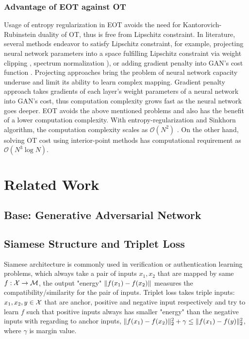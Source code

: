 \subsubsection{Advantage of EOT against OT}

Usage of entropy regularization in EOT avoids the need for Kantorovich-Rubinstein duality
of OT, thus is free from Lipschitz constraint. In literature, several methods endeavor to
satisfy Lipschitz constraint, for example, projecting neural network
parameters into a space fulfilling Lipschitz constraint via weight
clipping \cite{2017arXiv170107875A}, spectrum
normalization \cite{2018arXiv180205957M}), or adding gradient 
penalty into GAN's cost function \cite{2017arXiv170400028G}. Projecting
approaches bring the problem of neural network capacity underuse and
limit its ability to learn complex mapping. Gradient penalty approach takes
gradients of each layer's weight parameters of a neural network into
GAN's cost, thus computation complexity grows fast as the neural
network goes deeper. 
EOT avoids the above mentioned problems and also has the benefit of a lower
computation complexity. With entropy-regularization and Sinkhorn
algorithm, the computation complexity scales as $\mathcal{O}(N^2)$ \cite{2013arXiv1306.0895C}. 
On the other hand, solving OT cost using interior-point methods has computational requirement as 
$\mathcal{O}(N^3\log{N})$. 


\section{Related Work}
\subsection{Base: Generative Adversarial Network}


\subsection{Siamese Structure and Triplet Loss}

Siamese architecture is commonly used in verification or
authentication learning problems\cite{1467314}, which always take a
pair of inputs $x_1, x_2$ that are mapped by same $f: \mathcal{X} \rightarrow
\mathcal{M}$, the output "energy" $\| f(x_1) - f(x_2) \|$ measures the
compatibility/similarity for the pair of inputs.
Triplet loss \cite{7298682} takes triple inputs: $x_1, x_2, y \in \mathcal{X}$
that are anchor, positive and negative input respectively and try to
learn $f$ such that positive inputs always has smaller "energy" than
the negative inputs with regarding to anchor inputs,
$\| f(x_1)-f(x_2) \|_{2}^2 + \gamma \le \| f(x_1)-f(y) \|_{2}^2$, 
where $\gamma$ is margin value.

